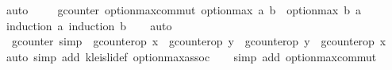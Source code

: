 \begin{isabellebody}
\ {\isacharparenleft}auto{\isacharparenright}\isanewline
\ \ \isamarkupfalse%
%
\endisatagproof
{\isafoldproof}%
%
\isadelimproof
\isanewline
%
\endisadelimproof
\isanewline
{}\isamarkupfalse%
\ {\isacharparenleft}\ gcounter{\isacharparenright}\ option{\isacharunderscore}max{\isacharunderscore}commut{\isacharcolon}\ {\isachardoublequoteopen}option{\isacharunderscore}max\ a\ b\ {\isacharequal}\ option{\isacharunderscore}max\ b\ a{\isachardoublequoteclose}\isanewline
%
\isadelimproof
\ \ %
\endisadelimproof
%
\isatagproof
{}\isamarkupfalse%
\ {\isacharparenleft}induction\ a{\isacharsemicolon}\ induction\ b{\isacharparenright}\isanewline
\ \ \isamarkupfalse%
\ {\isacharparenleft}auto{\isacharparenright}\isanewline
\ \ \isamarkupfalse%
%
\endisatagproof
{\isafoldproof}%
%
\isadelimproof
\isanewline
%
\endisadelimproof
\isanewline
{}\isamarkupfalse%
\ {\isacharparenleft}\ gcounter{\isacharparenright}\ {\isacharbrackleft}simp{\isacharbrackright}\ {\isacharcolon}\ {\isachardoublequoteopen}gcounter{\isacharunderscore}op\ x\ {\isasymrhd}\ gcounter{\isacharunderscore}op\ y\ {\isacharequal}\ gcounter{\isacharunderscore}op\ y\ {\isasymrhd}\ gcounter{\isacharunderscore}op\ x{\isachardoublequoteclose}\isanewline
%
\isadelimproof
\ \ %
\endisadelimproof
%
\isatagproof
{}\isamarkupfalse%
\ {\isacharparenleft}auto\ simp\ add{\isacharcolon}\ kleisli{\isacharunderscore}def\ option{\isacharunderscore}max{\isacharunderscore}assoc{\isacharparenright}\isanewline
\ \ \isamarkupfalse%
\ {\isacharparenleft}simp\ add{\isacharcolon}\ option{\isacharunderscore}max{\isacharunderscore}commut{\isacharparenright}\isanewline
\ \ \isamarkupfalse%
%
\endisatagproof
{\isafoldproof}%
\end{isabellebody}
